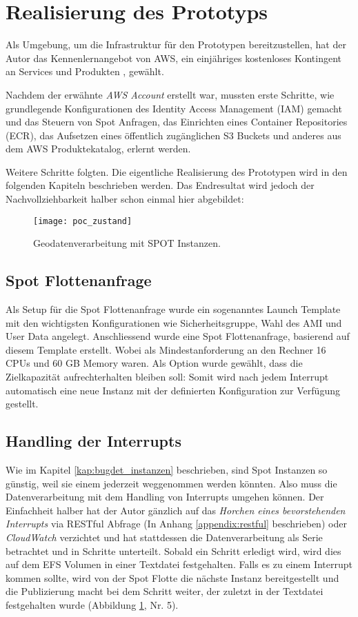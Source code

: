 \section{Realisierung des Prototyps}
Als Umgebung, um die Infrastruktur für den Prototypen bereitzustellen, hat der Autor das Kennenlernangebot von AWS, ein einjähriges kostenloses Kontingent an Services und Produkten \cite{FreeTier2020}, gewählt.

Nachdem der erwähnte \emph{AWS Account} erstellt war, mussten erste Schritte, wie grundlegende Konfigurationen des Identity Access Management (IAM) gemacht und das Steuern von Spot Anfragen, das Einrichten eines Container Repositories (ECR), das Aufsetzen eines öffentlich zugänglichen S3 Buckets und anderes aus dem AWS Produktekatalog, erlernt werden.

Weitere Schritte folgten. Die eigentliche Realisierung des Prototypen wird in den folgenden Kapiteln beschrieben werden. Das Endresultat wird jedoch der Nachvollziehbarkeit halber schon einmal hier abgebildet:

\begin{figure}[H]
	\centering
	\texttt{[image: poc\_zustand]}
	\caption{Geodatenverarbeitung mit SPOT Instanzen.}
	\label{fig:ist_zustand}
\end{figure}

\subsection{Spot Flottenanfrage}
Als Setup für die Spot Flottenanfrage wurde ein sogenanntes Launch Template mit den wichtigsten Konfigurationen wie Sicherheitsgruppe, Wahl des AMI und User Data angelegt. Anschliessend wurde eine Spot Flottenanfrage, basierend auf diesem Template erstellt. Wobei als Mindestanforderung an den Rechner 16 CPUs und 60 GB Memory waren. Als Option wurde gewählt, dass die Zielkapazität aufrechterhalten bleiben soll: Somit wird nach jedem Interrupt automatisch eine neue Instanz mit der definierten Konfiguration zur Verfügung gestellt.

\subsection{Handling der Interrupts}
Wie im Kapitel \ref{kap:bugdet_instanzen} beschrieben, sind Spot Instanzen so günstig, weil sie einem jederzeit weggenommen werden könnten. Also muss die Datenverarbeitung mit dem Handling von Interrupts umgehen können. 
Der Einfachheit halber hat der Autor gänzlich auf das \textit{Horchen eines bevorstehenden Interrupts} via RESTful Abfrage (In Anhang \ref{appendix:restful} beschrieben) oder \emph{CloudWatch} verzichtet und hat stattdessen die Datenverarbeitung als Serie betrachtet und in Schritte unterteilt. Sobald ein Schritt erledigt wird, wird dies auf dem EFS Volumen in einer Textdatei festgehalten. Falls es zu einem Interrupt kommen sollte, wird von der Spot Flotte die nächste Instanz bereitgestellt und die Publizierung macht bei dem Schritt weiter, der zuletzt in der Textdatei festgehalten wurde (Abbildung \ref{fig:ist_zustand}, Nr. 5).

